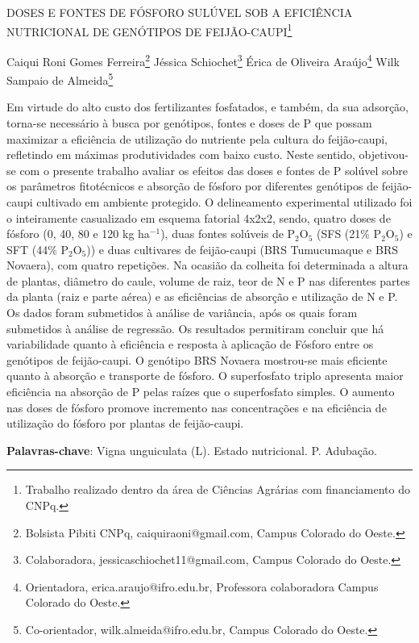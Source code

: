 \documentclass[article,12pt,onesidea,4paper,english,brazil]{abntex2}
\begin{document}
	
	
	\frenchspacing 
	
	\begin{center}
		\LARGE DOSES E FONTES DE FÓSFORO SULÚVEL SOB A EFICIÊNCIA NUTRICIONAL
		DE GENÓTIPOS DE FEIJÃO-CAUPI\footnote{Trabalho realizado dentro da área de Ciências Agrárias com financiamento do CNPq.}
		
		\normalsize
		Caiqui Roni Gomes Ferreira\footnote{Bolsista Pibiti CNPq, caiquiraoni@gmail.com, Campus Colorado do Oeste.} 
		Jéssica Schiochet\footnote{Colaboradora, jessicaschiochet11@gmail.com, Campus Colorado do Oeste.} 
		Érica de Oliveira Araújo\footnote{Orientadora, erica.araujo@ifro.edu.br, Professora colaboradora Campus Colorado do Oeste.} 
		Wilk Sampaio de Almeida\footnote{Co-orientador, wilk.almeida@ifro.edu.br, Campus Colorado do Oeste.} 
	\end{center}
	
	\noindent Em virtude do alto custo dos fertilizantes fosfatados, e também, da sua adsorção,
	torna-se necessário à busca por genótipos, fontes e doses de P que possam
	maximizar a eficiência de utilização do nutriente pela cultura do feijão-caupi,
	refletindo em máximas produtividades com baixo custo. Neste sentido, objetivou-se
	com o presente trabalho avaliar os efeitos das doses e fontes de P solúvel sobre os
	parâmetros fitotécnicos e absorção de fósforo por diferentes genótipos de feijão-
	caupi cultivado em ambiente protegido. O delineamento experimental utilizado foi o
	inteiramente casualizado em esquema fatorial 4x2x2, sendo, quatro doses de fósforo
	(0, 40, 80 e 120 kg ha$^{-1}$), duas fontes solúveis de P$_2$O$_5$ (SFS (21\% P$_2$O$_5$) e SFT (44\% P$_2$O$_5$)) e duas cultivares de feijão-caupi (BRS Tumucumaque e BRS Novaera), com
	quatro repetições. Na ocasião da colheita foi determinada a altura de plantas,
	diâmetro do caule, volume de raiz, teor de N e P nas diferentes partes da planta (raiz
	e parte aérea) e as eficiências de absorção e utilização de N e P. Os dados foram
	submetidos à análise de variância, após os quais foram submetidos à análise de
	regressão. Os resultados permitiram concluir que há variabilidade quanto à eficiência
	e resposta à aplicação de Fósforo entre os genótipos de feijão-caupi. O genótipo
	BRS Novaera mostrou-se mais eficiente quanto à absorção e transporte de fósforo.
	O superfosfato triplo apresenta maior eficiência na absorção de P pelas raízes que o
	superfosfato simples. O aumento nas doses de fósforo promove incremento nas
	concentrações e na eficiência de utilização do fósforo por plantas de feijão-caupi.
	
	\vspace{\onelineskip}
	
	\noindent
	\textbf{Palavras-chave}: Vigna unguiculata (L). Estado nutricional. P. Adubação.
	
\end{document}
